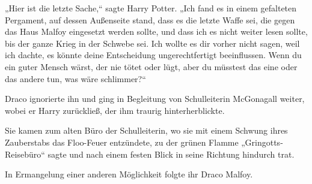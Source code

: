 „Hier ist die letzte Sache,“ sagte Harry Potter. „Ich fand es in einem gefalteten Pergament, auf dessen Außenseite stand, dass es die letzte Waffe sei, die gegen das Haus Malfoy eingesetzt werden sollte, und dass ich es nicht weiter lesen sollte, bis der ganze Krieg in der Schwebe sei. Ich wollte es dir vorher nicht sagen, weil ich dachte, es könnte deine Entscheidung ungerechtfertigt beeinflussen. Wenn du ein guter Mensch wärst, der nie tötet oder lügt, aber du müsstest das eine oder das andere tun, was wäre schlimmer?“

Draco ignorierte ihn und ging in Begleitung von Schulleiterin McGonagall weiter, wobei er Harry zurückließ, der ihm traurig hinterherblickte.

Sie kamen zum alten Büro der Schulleiterin, wo sie mit einem Schwung ihres Zauberstabs das Floo-Feuer entzündete, zu der grünen Flamme „Gringotts-Reisebüro“ sagte und nach einem festen Blick in seine Richtung hindurch trat.

In Ermangelung einer anderen Möglichkeit folgte ihr Draco Malfoy.

\later

